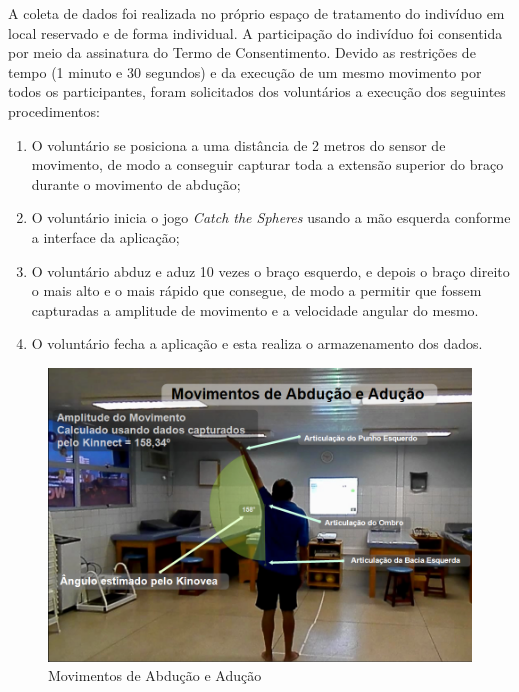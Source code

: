 A coleta de dados foi realizada no próprio espaço de tratamento do indivíduo em local reservado e de forma individual. A participação do indivíduo foi consentida por meio da assinatura do Termo de Consentimento. Devido as restrições de tempo (1 minuto e 30 segundos) e da execução de um mesmo movimento por todos os participantes, foram solicitados dos voluntários a execução dos seguintes procedimentos:
\begin{enumerate}
	\item O voluntário se posiciona a uma distância de 2 metros do sensor de movimento, de modo a conseguir capturar toda a extensão superior do braço durante o movimento de abdução; 	
	\item O voluntário inicia o jogo \textit{Catch the Spheres} usando a mão esquerda conforme a interface da aplicação;
	\item O voluntário abduz e aduz 10 vezes o braço esquerdo, e depois o braço direito o mais alto e o mais rápido que consegue, de modo a permitir que fossem capturadas a amplitude de movimento e a velocidade angular do mesmo. 
	\item O voluntário fecha a aplicação e esta realiza o armazenamento dos dados.
\end{enumerate}

\begin{figure}[!htbp]
 \centering
 \includegraphics[scale=0.5]{./img/capturaducaokinnect.png}
\caption{Movimentos de Abdução e Adução}
 \label{fig:movabducaomet}
\end{figure}

